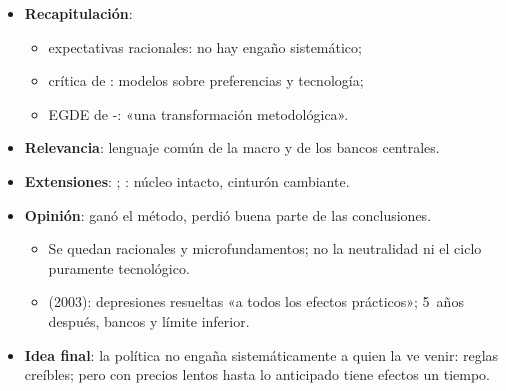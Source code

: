 \documentclass{article}
\begin{document}
\begin{columnas}
\begin{itemize}
\item \textbf{Recapitulación}:
  \begin{itemize}
  \item expectativas racionales: no hay engaño sistemático;
  \item crítica de : modelos sobre preferencias y tecnología;
  \item EGDE de -: «una transformación metodológica».
  \end{itemize}
\item \textbf{Relevancia}: lenguaje común de la macro y de los bancos centrales.
\item \textbf{Extensiones}:     ; : núcleo intacto, cinturón cambiante.
\item \textbf{Opinión}: ganó el método, perdió buena parte de las conclusiones.
  \begin{itemize}
  \item Se quedan racionales y microfundamentos; no la neutralidad ni el ciclo puramente tecnológico.
  \item {} (2003): depresiones resueltas «a todos los efectos prácticos»; 5~años después, bancos y límite inferior.
  \end{itemize}
\item \textbf{Idea final}: la política no engaña sistemáticamente a quien la ve venir: reglas creíbles; pero con precios lentos hasta lo anticipado tiene efectos un tiempo.
\end{itemize}


\end{columnas}
\end{document}
